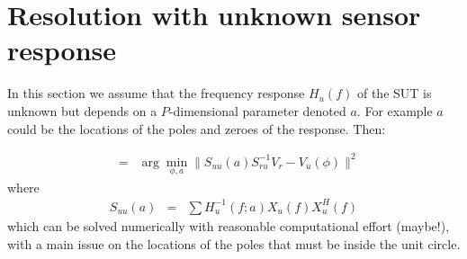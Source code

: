 \documentclass[a4paper, 12pt]{report}
\begin{document}
\section{Resolution with unknown sensor response}
In this section we assume that the frequency response $H_{u}(f)$ of the SUT is unknown but depends on a $P$-dimensional parameter denoted $a$. For example $a$ could be the locations of the poles and zeroes of the response.  Then:

\begin{eqnarray*}
[\hat \phi, \hat a] &=& \arg\min_{\phi, a} \|S_{uu}(a)S_{ru}^{-1} V_{r}- V_{u}(\phi)\|^{2}
\end{eqnarray*}
where 
\begin{eqnarray*}
S_{uu}(a) &=&
\sum H_{u}^{-1}(f;a)X_{u}(f)X_{u}^{H}(f)
\end{eqnarray*}
which can be solved numerically with reasonable computational effort (maybe!), with a  main issue on the locations of the poles that must be inside the unit circle.
\end{document}

